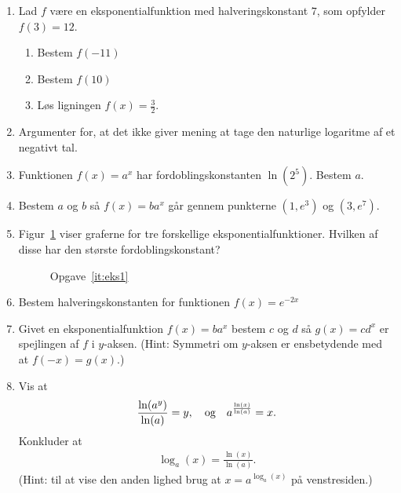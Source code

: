 \begin{enumerate}
	\item Lad $f$ være en eksponentialfunktion med halveringskonstant $7$, som opfylder $f(3)=12$.
	\begin{enumerate}
		\item Bestem $f(-11)$
		\item Bestem $f(10)$
		\item Løs ligningen $f(x)=\frac{3}{2}$.
	\end{enumerate}
	
	\item Argumenter for, at det ikke giver mening at tage den naturlige logaritme af et negativt tal.
	
	\item Funktionen $f(x)=a^x$ har fordoblingskonstanten $ \ln(2^5) $. Bestem $a$.
	
	
	\item Bestem $a$ og $b$ så $f(x)=ba^x$ går gennem punkterne $(1,e^3)$ og $(3,e^7)$.
	
	\item \label{it:eks1} Figur~\ref{fig:eks1} viser graferne for tre forskellige eksponentialfunktioner. Hvilken af disse har den største fordoblingskonstant?
	
	\begin{figure}
		\centering
		\caption{Opgave~\ref{it:eks1}}
		\label{fig:eks1}
	\end{figure}


	\item Bestem halveringskonstanten for funktionen $f(x)=e^{-2x}$
	
	
	\item Givet en eksponentialfunktion $f(x)=ba^x$ bestem $c$ og $d$ så $g(x)=cd^x$ er spejlingen af $f$ i $y$-aksen. (Hint: Symmetri om $y$-aksen er ensbetydende med at $f(-x)=g(x)$.)
	
	
	\item \label{it:eks2} Vis at 
	\begin{align*}
	\frac{\ln(a^y)}{\ln(a)}=y,\quad \textup{og}\quad a^{\frac{\ln(x)}{\ln(a)}}=x.
	\end{align*}
	Konkluder at
	\begin{align*}
	\log_a(x)=\frac{\ln(x)}{\ln(a)}.
	\end{align*}
	(Hint: til at vise den anden lighed brug at $ x=a^{\log_a(x)} $ på venstresiden.)
\end{enumerate}